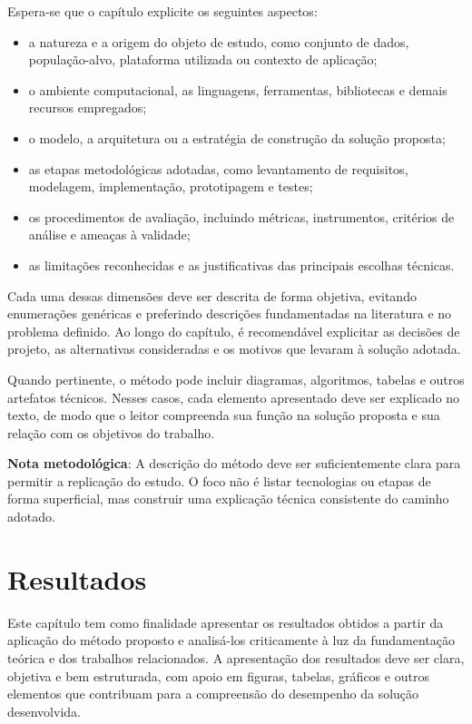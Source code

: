 \documentclass{eic-bcc-tcc}
\begin{document}
Espera-se que o capítulo explicite os seguintes aspectos:
\begin{itemize}
    \item a natureza e a origem do objeto de estudo, como conjunto de dados, população-alvo, plataforma utilizada ou contexto de aplicação;
    \item o ambiente computacional, as linguagens, ferramentas, bibliotecas e demais recursos empregados;
    \item o modelo, a arquitetura ou a estratégia de construção da solução proposta;
    \item as etapas metodológicas adotadas, como levantamento de requisitos, modelagem, implementação, prototipagem e testes;
    \item os procedimentos de avaliação, incluindo métricas, instrumentos, critérios de análise e ameaças à validade;
    \item as limitações reconhecidas e as justificativas das principais escolhas técnicas.
\end{itemize}

Cada uma dessas dimensões deve ser descrita de forma objetiva, evitando enumerações genéricas e preferindo descrições fundamentadas na literatura e no problema definido. Ao longo do capítulo, é recomendável explicitar as decisões de projeto, as alternativas consideradas e os motivos que levaram à solução adotada.

Quando pertinente, o método pode incluir diagramas, algoritmos, tabelas e outros artefatos técnicos. Nesses casos, cada elemento apresentado deve ser explicado no texto, de modo que o leitor compreenda sua função na solução proposta e sua relação com os objetivos do trabalho.

\textbf{Nota metodológica}: A descrição do método deve ser suficientemente clara para permitir a replicação do estudo. O foco não é listar tecnologias ou etapas de forma superficial, mas construir uma explicação técnica consistente do caminho adotado.


\chapter{Resultados}
\label{cha:resultados}

Este capítulo tem como finalidade apresentar os resultados obtidos a partir da aplicação do método proposto e analisá-los criticamente à luz da fundamentação teórica e dos trabalhos relacionados. A apresentação dos resultados deve ser clara, objetiva e bem estruturada, com apoio em figuras, tabelas, gráficos e outros elementos que contribuam para a compreensão do desempenho da solução desenvolvida.
\end{document}
